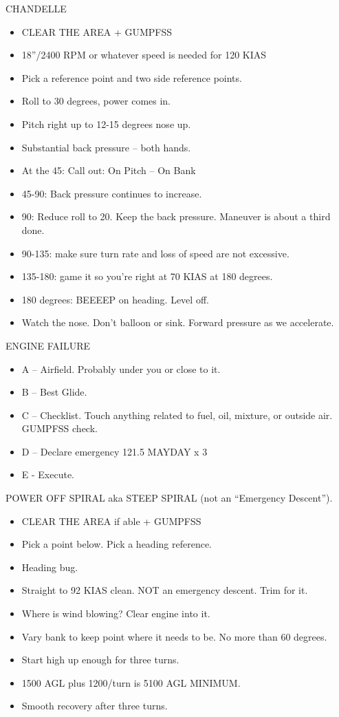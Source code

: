 CHANDELLE
\begin{itemize}
    \item CLEAR THE AREA + GUMPFSS
    \item 18”/2400 RPM or whatever speed is needed for 120 KIAS
    \item Pick a reference point and two side reference points.
    \item Roll to 30 degrees, power comes in.
    \item Pitch right up to 12-15 degrees nose up.
    \item Substantial back pressure – both hands.
    \item At the 45: Call out: On Pitch – On Bank
    \item 45-90: Back pressure continues to increase.
    \item 90: Reduce roll to 20. Keep the back pressure. Maneuver is about a third done.
    \item 90-135: make sure turn rate and loss of speed are not excessive.
    \item 135-180: game it so you’re right at 70 KIAS at 180 degrees.
    \item 180 degrees: BEEEEP on heading. Level off.
    \item Watch the nose. Don’t balloon or sink. Forward pressure as we accelerate.
\end{itemize}

ENGINE FAILURE
\begin{itemize}
    \item A – Airfield. Probably under you or close to it.
    \item B – Best Glide.
    \item C – Checklist. Touch anything related to fuel, oil, mixture, or outside air. GUMPFSS check.
    \item D – Declare emergency 121.5 MAYDAY x 3
    \item E - Execute.
\end{itemize}

POWER OFF SPIRAL aka STEEP SPIRAL (not an ``Emergency Descent'').
\begin{itemize}
    \item CLEAR THE AREA if able + GUMPFSS
    \item Pick a point below. Pick a heading reference.
    \item Heading bug.
    \item Straight to 92 KIAS clean. NOT an emergency descent. Trim for it.
    \item Where is wind blowing? Clear engine into it.
    \item Vary bank to keep point where it needs to be. No more than 60 degrees.
    \item Start high up enough for three turns.
    \item 1500 AGL plus 1200/turn is 5100 AGL MINIMUM.
    \item Smooth recovery after three turns.
\end{itemize}

